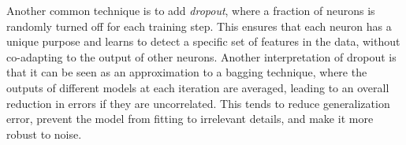 Another common technique is to add \textit{dropout}, where a fraction of neurons is randomly turned off for each training step.
This ensures that each neuron has a unique purpose and learns to detect a specific set of features in the data, without co-adapting to the output of other neurons.
Another interpretation of dropout is that it can be seen as an approximation to a bagging technique, where the outputs of different models at each iteration are averaged, leading to an overall reduction in errors if they are uncorrelated.
This tends to reduce generalization error, prevent the model from fitting to irrelevant details, and make it more robust to noise.

